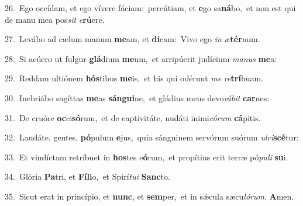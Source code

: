{\numbfont\textcolor{\numbcolor}{26.}}~Ego occídam, et ego vívere fáciam:~\dagger percútiam, et \textbf{e}\-go sa\-\textbf{ná}\-bo,~\star et non est qui de manu mea pos\textit{sit} \textit{e}\-\textbf{rú}ere.\par
{\numbfont\textcolor{\numbcolor}{27.}}~Levábo ad cælum manum \textbf{me}\-am, et \textbf{di}\-cam:~\star Vivo ego \textit{in} \textit{æ}\-\textbf{tér}num.\par
{\numbfont\textcolor{\numbcolor}{28.}}~Si acúero ut fulgur \textbf{glá}\-dium \textbf{me}\-um,~\star et arripúerit judícium \textit{ma}\-\textit{nus} \textbf{me}\-a:\par
{\numbfont\textcolor{\numbcolor}{29.}}~Reddam ultiónem \textbf{hós}\-tibus \textbf{me}\-is,~\star et his qui odérunt \textit{me} \textit{re}\-\textbf{trí}buam.\par
{\numbfont\textcolor{\numbcolor}{30.}}~Inebriábo sagíttas \textbf{me}\-as \textbf{sán}\-\textbf{gui}ne,~\star et gládius meus devo\-\textit{rá}\-\textit{bit} \textbf{car}\-nes:\par
{\numbfont\textcolor{\numbcolor}{31.}}~De cruóre \textbf{oc}\-ci\-\textbf{só}\-rum,~\star et de captivitáte, nudáti inimi\-\textit{có}\-\textit{rum} \textbf{cá}\-pitis.\par
{\numbfont\textcolor{\numbcolor}{32.}}~Laudáte, gentes, \textbf{pó}\-pulum \textbf{e}\-jus,~\star quia sánguinem servórum suórum \textit{ul}\-\textit{ci}\textbf{scé}tur:\par
{\numbfont\textcolor{\numbcolor}{33.}}~Et vindíctam retríbuet in \textbf{hos}\-tes e\-\textbf{ó}\-rum,~\star et propítius erit terræ pó\-\textit{pu}\-\textit{li} \textbf{su}\-i.\par
{\numbfont\textcolor{\numbcolor}{34.}}~Glória \textbf{Pa}\-tri, et \textbf{Fí}\-\textbf{li}o,~\star et Spirí\-\textit{tu}\-\textit{i} \textbf{Sanc}\-to.\par
{\numbfont\textcolor{\numbcolor}{35.}}~Sicut erat in princípio, et \textbf{nunc}\-, et \textbf{sem}\-per,~\star et in sǽcula sæcu\-\textit{ló}\-\textit{rum}. \textbf{A}\-men.\par
